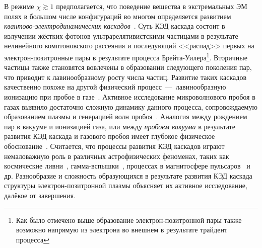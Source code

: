 В режиме $\chi\gtrsim 1$ предполагается, что поведение вещества в экстремальных ЭМ полях в большом числе конфигураций во многом определяется развитием \textit{квантово-электродинамических каскадов}~\cite{nerush2007radiation,Bell2008,Nerush11a,Ridgers12,narozhny2015quantum,Kostyukov2016,grismayer2017seeded,jirka2017qed,luo2018qed,Yuan2018,del2018ion,Lu2018,Luo2018,efimenko2019laser}.
Суть КЭД каскада состоит в излучении жёстких фотонов ультрарелятивистскими частицами в результате нелинейного комптоновского рассеяния и последующий <<распад>> первых на электрон-позитронные пары в результате процесса Брейта-Уилера\footnote{ Как было отмечено выше образование электрон-позитронной пары также возможно напрямую из электрона во внешнем в результате трайдент процесса}. 
Вторичные частицы также становятся вовлечены в образовании следующего поколения пар, что приводит к лавинообразному росту числа частиц.
Развитие таких каскадов качественно похоже на другой физический процесс~---~лавинообразную ионизацию при пробое в газе~\cite{raizer1997gas}.
Активное исследование микроволнового пробоя в газах выявило достаточно сложную динамику данного процесса, сопровождаемую образованием плазмы и генерацией волн пробоя~\cite{bollen1983high,semenov1982breakdown}.
Аналогия между рождением пар в вакууме и ионизацией газа, или между \textit{пробоем вакуума} в результате развития КЭД каскада и газового пробоя имеет глубокое физическое обоснование~\cite{dunne2012,narozhny2015quantum,efimenko2018extreme}.
Считается, что процессы развития КЭД каскадов играют немаловажную роль в различных астрофизических феноменах, таких как космические ливни~\cite{bhabha1937passage}, гамма-вспышки~\cite{meszaros2006gamma}, процессах в магнитосфере пульсаров~\cite{sturrock1971model,ruderman1975theory,daugherty1982electromagnetic, philippov2015ab} и др. 
Разнообразие и сложность образующихся в результате развития КЭД каскада структуры электрон-позитронной плазмы объясняет их активное исследование, далёкое от завершения.

